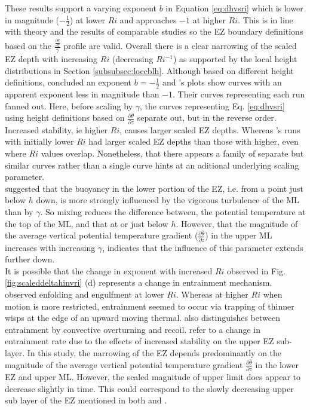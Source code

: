 \documentclass[referee]{svjour3}
\begin{document}
These results support a varying exponent $b$ in Equation \ref{eq:dhvsri} which is lower in magnitude ($-\frac{1}{2}$) at lower $Ri$ and approaches $-1$ at higher $Ri$.  This is in line with theory and the results of comparable studies so the EZ boundary definitions based on the $\frac{\frac{\partial \overline{\theta}}{\partial z}}{\gamma}$ profile are valid.  Overall there is a clear narrowing of the scaled EZ depth with increasing $Ri$ (decreasing $Ri^{-1}$) as supported by the local height distributions in Section \ref{subsubsec:loccblh}.  Although based on different height definitions, \cite{FedConzMir04} concluded an exponent $b = -\frac{1}{2}$ and \cite{BrooksFowler2}'s plots show curves with an apparent exponent less in magnitude than $-1$.  Their curves representing each run fanned out.  Here, before scaling by $\gamma$, the curves representing Eq. \ref{eq:dhvsri} using height definitions based on $\frac{\partial \overline{\theta}}{\partial z}$ separate out, but in the reverse order.  Increased stability, ie higher $Ri$, causes larger scaled EZ depths.  Whereas \cite{BrooksFowler2}'s runs with initially lower $Ri$ had larger scaled EZ depths than those with higher, even where $Ri$ values overlap. Nonetheless, that there appears a family of separate but similar curves rather than a single curve hints at an aditional underlying scaling parameter.\\     

\cite{GarciaMellado} suggested that the buoyancy in the lower portion of the EZ, i.e. from a point just below $h$ down, is more strongly influenced by the vigorous turbulence of the ML than by $\gamma$.  So mixing reduces the difference between, the potential temperature at the top of the ML, and that at or just below $h$.  However, that the magnitude of the average vertical potential temperature gradient ($\frac{\partial \overline{\theta}}{\partial z}$) in the upper ML increases with increasing $\gamma$, indicates that the influence of this parameter extends further down.\\

It is possible that the change in exponent with increased $Ri$ observed in Fig. \ref{fig:scaleddeltahinvri} (d) represents a change in entrainment mechanism. \cite{SullMoengStev} observed enfolding and engulfment at lower $Ri$.  Whereas at higher $Ri$ when motion is more restricted, entrainment seemed to occur via trapping of thinner wisps at the edge of an upward moving thermal.  \cite{Turner86} also distinguishes between entrainment by convective overturning and recoil. \cite{GarciaMellado} refer to a change in entrainment rate due to the effects of increased stability on the upper EZ sub-layer.  In this study, the narrowing of the EZ depends predominantly on the magnitude of the average vertical potential temperature gradient $\frac{\partial \overline{\theta}}{\partial z}$ in the lower EZ and upper ML.  However, the scaled magnitude of upper limit does appear to decrease slightly in time.  This could correspond to the slowly decreasing upper sub layer of the EZ mentioned in both \cite{GarciaMellado} and \cite{FedConzMir04}.\\
\end{document}
